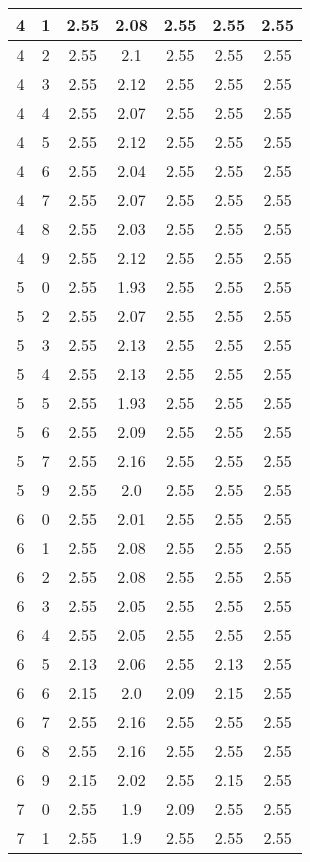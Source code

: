 \begin{longtable}{|c|c||c||c|c||c|c|}
	4 & 1 & 2.55 & 2.08 & 2.55 & 2.55 & 2.55 \\ \hline
	4 & 2 & 2.55 & 2.1 & 2.55 & 2.55 & 2.55 \\ \hline
	4 & 3 & 2.55 & 2.12 & 2.55 & 2.55 & 2.55 \\ \hline
	4 & 4 & 2.55 & 2.07 & 2.55 & 2.55 & 2.55 \\ \hline
	4 & 5 & 2.55 & 2.12 & 2.55 & 2.55 & 2.55 \\ \hline
	4 & 6 & 2.55 & 2.04 & 2.55 & 2.55 & 2.55 \\ \hline
	4 & 7 & 2.55 & 2.07 & 2.55 & 2.55 & 2.55 \\ \hline
	4 & 8 & 2.55 & 2.03 & 2.55 & 2.55 & 2.55 \\ \hline
	4 & 9 & 2.55 & 2.12 & 2.55 & 2.55 & 2.55 \\ \hline
	5 & 0 & 2.55 & 1.93 & 2.55 & 2.55 & 2.55 \\ \hline
	5 & 2 & 2.55 & 2.07 & 2.55 & 2.55 & 2.55 \\ \hline
	5 & 3 & 2.55 & 2.13 & 2.55 & 2.55 & 2.55 \\ \hline
	5 & 4 & 2.55 & 2.13 & 2.55 & 2.55 & 2.55 \\ \hline
	5 & 5 & 2.55 & 1.93 & 2.55 & 2.55 & 2.55 \\ \hline
	5 & 6 & 2.55 & 2.09 & 2.55 & 2.55 & 2.55 \\ \hline
	5 & 7 & 2.55 & 2.16 & 2.55 & 2.55 & 2.55 \\ \hline
	5 & 9 & 2.55 & 2.0 & 2.55 & 2.55 & 2.55 \\ \hline
	6 & 0 & 2.55 & 2.01 & 2.55 & 2.55 & 2.55 \\ \hline
	6 & 1 & 2.55 & 2.08 & 2.55 & 2.55 & 2.55 \\ \hline
	6 & 2 & 2.55 & 2.08 & 2.55 & 2.55 & 2.55 \\ \hline
	6 & 3 & 2.55 & 2.05 & 2.55 & 2.55 & 2.55 \\ \hline
	6 & 4 & 2.55 & 2.05 & 2.55 & 2.55 & 2.55 \\ \hline
	6 & 5 & 2.13 & 2.06 & 2.55 & 2.13 & 2.55 \\ \hline
	6 & 6 & 2.15 & 2.0 & 2.09 & 2.15 & 2.55 \\ \hline
	6 & 7 & 2.55 & 2.16 & 2.55 & 2.55 & 2.55 \\ \hline
	6 & 8 & 2.55 & 2.16 & 2.55 & 2.55 & 2.55 \\ \hline
	6 & 9 & 2.15 & 2.02 & 2.55 & 2.15 & 2.55 \\ \hline
	7 & 0 & 2.55 & 1.9 & 2.09 & 2.55 & 2.55 \\ \hline
	7 & 1 & 2.55 & 1.9 & 2.55 & 2.55 & 2.55 \\ \hline

\end{longtable}
